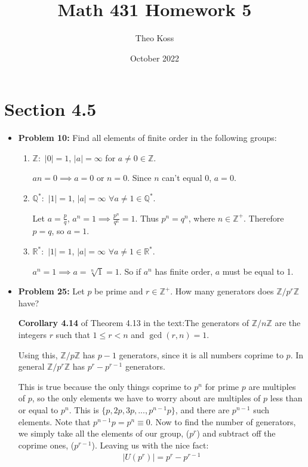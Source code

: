 \documentclass[a4paper,12pt]{extarticle}
\title{Math 431 Homework 5}
\author{Theo Koss}
\date{October 2022}
\theoremstyle{definition}
\newcommand{\R}{\mathbb{R}} \newcommand{\Q}{\mathbb{Q}} \newcommand{\Z}{\mathbb{Z}} \newcommand{\N}{\mathbb{N}} \newcommand{\myskip}{\par\null\par} \renewcommand\qedsymbol{QED} \renewcommand{\leq}{\leqslant}\renewcommand{\geq}{\geqslant}
\begin{document}
    \maketitle
\section*{Section 4.5}
\begin{itemize}
    \item \textbf{Problem 10:} Find all elements of finite order in the following groups:\begin{enumerate}
        \item $\Z:$ $|0|=1$, $|a|=\infty$ for $a\neq0\in\Z$.\myskip $an=0\implies a=0\text{ or }n=0$. Since $n$ can't equal 0, $a=0$.
        \item $\Q^*:$ $|1|=1$, $|a|=\infty$ $\forall a\neq1\in\Q^*$. \myskip Let $a=\frac{p}{q}$, $a^n=1\implies \frac{p^n}{q^n}=1$. Thus $p^n=q^n$, where $n\in\Z^+$. Therefore $p=q$, so $a=1$.
        \item $\R^*:$ $|1|=1$, $|a|=\infty$ $\forall a\neq1\in\R^*$. \myskip $a^n=1\implies a=\sqrt[n]{1}=1$. So if $a^n$ has finite order, $a$ must be equal to 1.
    \end{enumerate}
    \item \textbf{Problem 25:} Let $p$ be prime and $r\in\Z^+$. How many generators does $\Z\slash p^r\Z$ have?\myskip \textbf{Corollary 4.14} of Theorem 4.13 in the text:\newline The generators of $\Z\slash n\Z$ are the integers $r$ such that $1\leq r< n$ and $\gcd(r,n)=1$.
    \myskip Using this, $\Z\slash p\Z$ has $p-1$ generators, since it is all numbers coprime to $p$. In general $\Z\slash p^r\Z$ has $p^r-p^{r-1}$ generators. \myskip This is true because the only things coprime to $p^n$ for prime $p$ are multiples of $p$, so the only elements we have to worry about are multiples of $p$ less than or equal to $p^n$. This is $\{p,2p,3p,...,p^{n-1}p\}$, and there are $p^{n-1}$ such elements. Note that $p^{n-1}p=p^n\equiv0$. Now to find the number of generators, we simply take all the elements of our group, ($p^r$) and subtract off the coprime ones, ($p^{r-1}$). Leaving us with the nice fact: \begin{align}
        |U(p^r)|=p^r-p^{r-1}
    \end{align}
\end{itemize}
\end{document}

